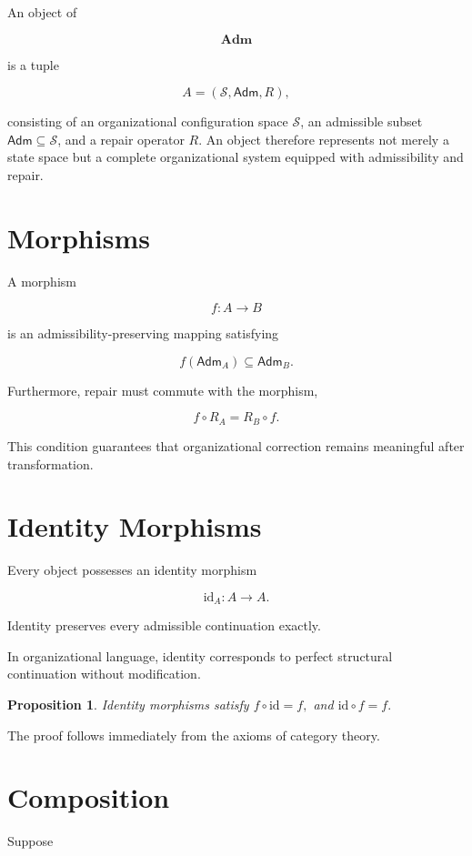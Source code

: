 \documentclass[11pt,oneside]{book}
\numberwithin{equation}{chapter}
\theoremstyle{definition}
\theoremstyle{plain}
\newtheorem{proposition}[definition]{Proposition}
\newcommand{\Adm}{\mathsf{Adm}}
\begin{document}
An object of

\[
\mathbf{Adm}
\]

is a tuple

\[
A
=
(\mathcal S,\Adm,R),
\]

consisting of an organizational configuration space \(\mathcal S\), an admissible subset \(\Adm \subseteq \mathcal S\), and a repair operator \(R\). An object therefore represents not merely a state space but a complete organizational system equipped with admissibility and repair.

\section{Morphisms}

A morphism

\[
f
:
A
\rightarrow
B
\]

is an admissibility-preserving mapping satisfying

\[
f
(
\Adm_A
)
\subseteq
\Adm_B.
\]

Furthermore, repair must commute with the morphism,

\[
f
\circ
R_A
=
R_B
\circ
f.
\]

This condition guarantees that organizational correction remains
meaningful after transformation.

\section{Identity Morphisms}

Every object possesses an identity morphism

\[
\mathrm{id}_A
:
A
\rightarrow
A.
\]

Identity preserves every admissible continuation exactly.

In organizational language, identity corresponds to perfect structural
continuation without modification.

\begin{proposition}
Identity morphisms satisfy
\(
f
\circ
\mathrm{id}
=
f,
\)
and
\(
\mathrm{id}
\circ
f
=
f.
\)
\end{proposition}

The proof follows immediately from the axioms of category theory.

\section{Composition}

Suppose
\end{document}
